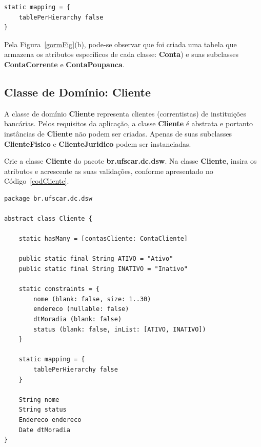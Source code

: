 \begin{cBox}
\begin{verbatim}
static mapping = {
    tablePerHierarchy false
}
\end{verbatim}
\end{cBox}

Pela  Figura~\ref{gormFig}(b), pode-se observar  que foi  criada uma  tabela que
armazena os atributos específicos de cada classe: {\bf Conta}) e suas subclasses
{\bf ContaCorrente} e {\bf ContaPoupanca}.

\newpage

\subsection{Classe de Domínio: Cliente}\label{secCliente}

\vspace{0.5cm}

A  classe  de  domínio  {\bf  Cliente}  representa  clientes  (correntistas)  de
instituições bancárias. Pelos requisitos da  aplicação, a classe {\bf Cliente} é
abstrata e portanto instâncias de {\bf Cliente} não podem ser criadas. Apenas de
suas  subclasses   {\bf  ClienteFisico}   e  {\bf  ClienteJuridico}   podem  ser
instanciadas.

Crie a  classe {\bf Cliente} do  pacote {\bf br.ufscar.dc.dsw}.   Na classe {\bf
  Cliente},  insira  os atributos  e  acrescente  as  suas validações,  conforme
apresentado no Código~\ref{codCliente}. 

\begin{lstlisting}[caption=Classe  de  domínio  {\bf  Cliente},  frame  =  trBL,
    float=htbp, label=codCliente] 
package br.ufscar.dc.dsw

abstract class Cliente {

    static hasMany = [contasCliente: ContaCliente]
    
    public static final String ATIVO = "Ativo"
    public static final String INATIVO = "Inativo"
    
    static constraints = {
        nome (blank: false, size: 1..30)
        endereco (nullable: false)
        dtMoradia (blank: false)
        status (blank: false, inList: [ATIVO, INATIVO])
    }
    
    static mapping = { 
        tablePerHierarchy false
    }
    
    String nome
    String status
    Endereco endereco
    Date dtMoradia
}
\end{lstlisting}

